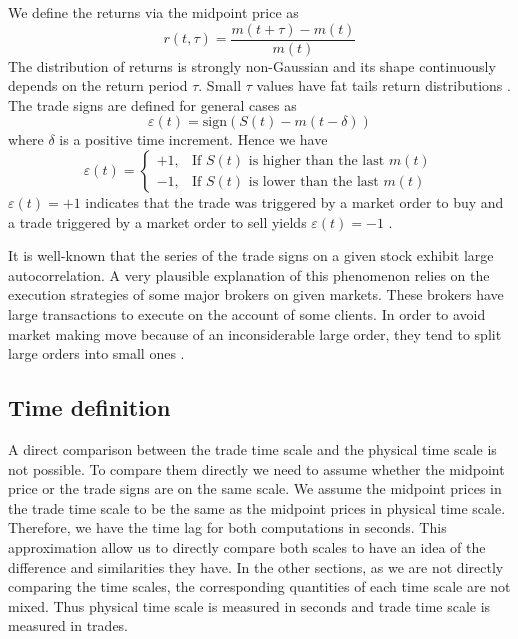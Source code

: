 We define the returns via the midpoint price as
\begin{equation}\label{eq:midpoint_price_return}
    r\left(t,\tau\right) = \frac{m\left(t+\tau\right)-m\left(t\right)}
    {m\left(t\right)}
\end{equation}
The distribution of returns is strongly non-Gaussian and its shape continuously
depends on the return period $\tau$. Small $\tau$ values have fat tails return
distributions \cite{subtle_nature}. The trade signs are defined for general
cases as
\begin{equation}\label{eq:trade_sign_general}
    \varepsilon\left(t\right)=\text{sign}\left(S\left(t\right)
    -m\left(t-\delta\right)\right)
\end{equation}
where $\delta$ is a positive time increment. Hence we have
\begin{equation}\label{eq:trade_sign_results}
    \varepsilon\left(t\right)=\left\{
    \begin{array}{cc}
    +1, & \text{If } S\left(t\right)
    \text{ is higher than the last } m\left( t \right)\\
    -1, & \text{If } S\left(t\right)
    \text{ is lower than the last } m\left( t \right)
    \end{array}\right.
\end{equation}
$\varepsilon(t) = +1$ indicates that the trade was triggered by a market order
to buy and a trade triggered by a market order to sell yields
$\varepsilon(t) = -1$
\cite{subtle_nature,Bouchaud_2004,spread_changes_affect,quant_stock_price_response,order_flow_persistent}.

It is well-known that the series of the trade signs on a given stock exhibit
large autocorrelation. A very plausible explanation of this phenomenon relies
on the execution strategies of some major brokers on given markets. These
brokers have large transactions to execute on the account of some clients. In
order to avoid market making move because of an inconsiderable large order,
they tend to split large orders into small ones \cite{empirical_facts}.

\subsection{Time definition}\label{subsec:time_definition}

A direct comparison between the trade time scale and the physical time scale is
not possible. To compare them directly we need to assume whether the midpoint
price or the trade signs are on the same scale. We assume the midpoint prices
in the trade time scale to be the same as the midpoint prices in physical time
scale. Therefore, we have the time lag for both computations in seconds. This
approximation allow us to directly compare both scales to have an idea of the
difference and similarities they have. In the other sections, as we are not
directly comparing the time scales, the corresponding quantities of each time
scale are not mixed. Thus physical time scale is measured in seconds and trade
time scale is measured in trades.

